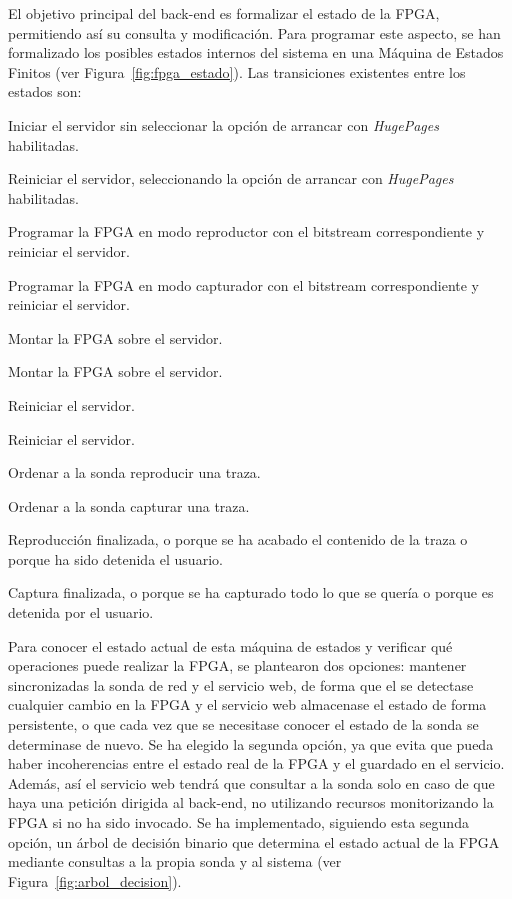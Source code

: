 El objetivo principal del \gls{back-end} es formalizar el estado de la \gls{FPGA}, permitiendo así su consulta y modificación.
Para programar este aspecto, se han formalizado los posibles estados internos del sistema en una Máquina de Estados Finitos (ver Figura~\ref{fig:fpga_estado}).
Las transiciones existentes entre los estados son:
\begin{enumerate}[label={\bfseries [\arabic*]}]
  \item Iniciar el servidor sin seleccionar la opción de arrancar con \textit{HugePages} habilitadas.
  \item Reiniciar el servidor, seleccionando la opción de arrancar con \textit{HugePages} habilitadas.
  \item Programar la \gls{FPGA} en modo reproductor con el \gls{bitstream} correspondiente y reiniciar el servidor.
  \item Programar la \gls{FPGA} en modo capturador con el \gls{bitstream} correspondiente y reiniciar el servidor.
  \item Montar la \gls{FPGA} sobre el servidor.
  \item Montar la \gls{FPGA} sobre el servidor.
  \item Reiniciar el servidor.
  \item Reiniciar el servidor.
  \item Ordenar a la sonda reproducir una \gls{traza}.
  \item Ordenar a la sonda capturar una \gls{traza}.
  \item Reproducción finalizada, o porque se ha acabado el contenido de la \gls{traza} o porque ha sido detenida el usuario.
  \item Captura finalizada, o porque se ha capturado todo lo que se quería o porque es detenida por el usuario.
\end{enumerate}

Para conocer el estado actual de esta máquina de estados y verificar qué operaciones puede realizar la \gls{FPGA}, se plantearon dos opciones: mantener sincronizadas la sonda de red y el servicio web, de forma que el se detectase cualquier cambio en la \gls{FPGA} y el servicio web almacenase el estado de forma persistente, o que cada vez que se necesitase conocer el estado de la sonda se determinase de nuevo.
Se ha elegido la segunda opción, ya que evita que pueda haber incoherencias entre el estado real de la \gls{FPGA} y el guardado en el servicio.
Además, así el servicio web tendrá que consultar a la sonda solo en caso de que haya una petición dirigida al \gls{back-end}, no utilizando recursos monitorizando la \gls{FPGA} si no ha sido invocado.
Se ha implementado, siguiendo esta segunda opción, un árbol de decisión binario que determina el estado actual de la \gls{FPGA} mediante consultas a la propia sonda y al sistema (ver Figura~\ref{fig:arbol_decision}).

